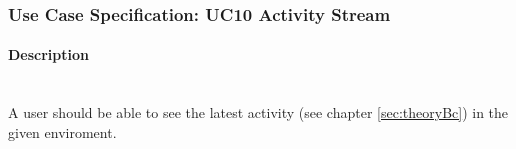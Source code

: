 
\newpage
\subsubsection{Use Case Specification: \ac{UC}10 Activity Stream}
\label{sec:domainBbk}

\paragraph*{Description}\mbox{}\\
A user should be able to see the latest activity (see chapter \ref{sec:theoryBc}) in the given enviroment.



